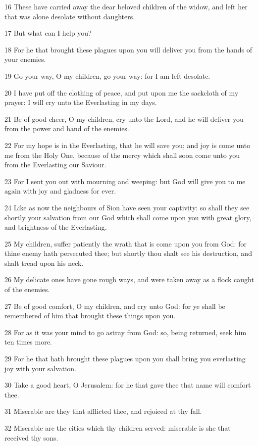 \par 16 These have carried away the dear beloved children of the widow, and left her that was alone desolate without daughters.
\par 17 But what can I help you?
\par 18 For he that brought these plagues upon you will deliver you from the hands of your enemies.
\par 19 Go your way, O my children, go your way: for I am left desolate.
\par 20 I have put off the clothing of peace, and put upon me the sackcloth of my prayer: I will cry unto the Everlasting in my days.
\par 21 Be of good cheer, O my children, cry unto the Lord, and he will deliver you from the power and hand of the enemies.
\par 22 For my hope is in the Everlasting, that he will save you; and joy is come unto me from the Holy One, because of the mercy which shall soon come unto you from the Everlasting our Saviour.
\par 23 For I sent you out with mourning and weeping: but God will give you to me again with joy and gladness for ever.
\par 24 Like as now the neighbours of Sion have seen your captivity: so shall they see shortly your salvation from our God which shall come upon you with great glory, and brightness of the Everlasting.
\par 25 My children, suffer patiently the wrath that is come upon you from God: for thine enemy hath persecuted thee; but shortly thou shalt see his destruction, and shalt tread upon his neck.
\par 26 My delicate ones have gone rough ways, and were taken away as a flock caught of the enemies.
\par 27 Be of good comfort, O my children, and cry unto God: for ye shall be remembered of him that brought these things upon you.
\par 28 For as it was your mind to go astray from God: so, being returned, seek him ten times more.
\par 29 For he that hath brought these plagues upon you shall bring you everlasting joy with your salvation.
\par 30 Take a good heart, O Jerusalem: for he that gave thee that name will comfort thee.
\par 31 Miserable are they that afflicted thee, and rejoiced at thy fall.
\par 32 Miserable are the cities which thy children served: miserable is she that received thy sons.
